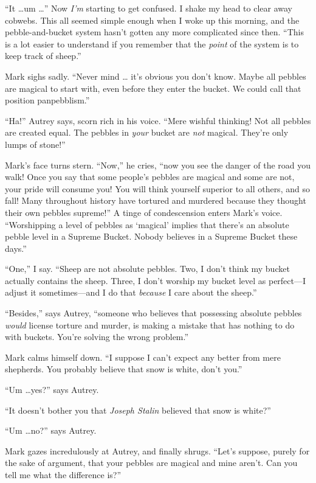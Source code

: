 {
 ``It \ldots um \ldots'' Now
\textit{I'm} starting to get confused. I shake my head
to clear away cobwebs. This all seemed simple enough when I woke up
this morning, and the pebble-and-bucket system hasn't
gotten any more complicated since then. ``This is a
lot easier to understand if you remember that the \textit{point} of the
system is to keep track of sheep.''}

{
 Mark sighs sadly. ``Never mind \ldots
it's obvious you don't know. Maybe all
pebbles are magical to start with, even before they enter the bucket.
We could call that position panpebblism.''}

{
 ``Ha!'' Autrey says, scorn rich
in his voice. ``Mere wishful thinking! Not all pebbles
are created equal. The pebbles in \textit{your} bucket are \textit{not}
magical. They're only lumps of
stone!''}

{
 Mark's face turns stern.
``Now,'' he cries,
``now you see the danger of the road you walk! Once
you say that some people's pebbles are magical and some
are not, your pride will consume you! You will think yourself superior
to all others, and so fall! Many throughout history have tortured and
murdered because they thought their own pebbles
supreme!'' A tinge of condescension enters
Mark's voice. ``Worshipping a level of
pebbles as `magical' implies that
there's an absolute pebble level in a Supreme Bucket.
Nobody believes in a Supreme Bucket these days.''}

{
 ``One,'' I say.
``Sheep are not absolute pebbles. Two, I
don't think my bucket actually contains the sheep.
Three, I don't worship my bucket level as perfect---I
adjust it sometimes---and I do that \textit{because} I care about the
sheep.''}

{
 ``Besides,'' says Autrey,
``someone who believes that possessing absolute
pebbles \textit{would} license torture and murder, is making a mistake
that has nothing to do with buckets. You're solving the
wrong problem.''}

{
 Mark calms himself down. ``I suppose I
can't expect any better from mere shepherds. You
probably believe that snow is white, don't
you.''}

{
 ``Um \ldots yes?'' says Autrey.}

{
 ``It doesn't bother you that
\textit{Joseph Stalin} believed that snow is
white?''}

{
 ``Um \ldots no?'' says Autrey.}

{
 Mark gazes incredulously at Autrey, and finally shrugs.
``Let's suppose, purely for the sake
of argument, that your pebbles are magical and mine
aren't. Can you tell me what the difference
is?''}

